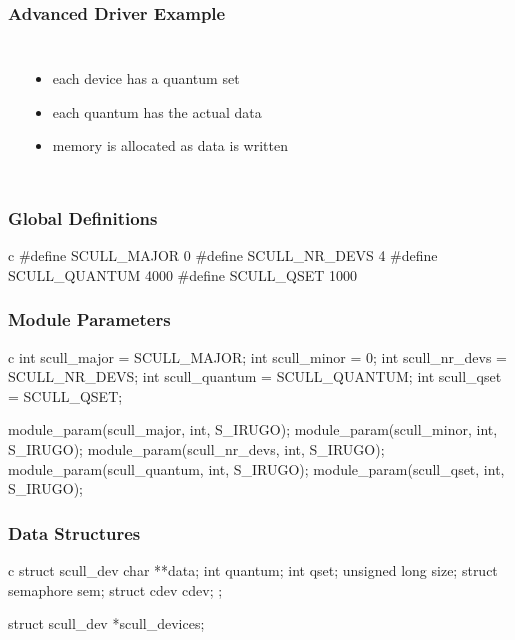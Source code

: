 \documentclass[dvipsnames]{beamer}
\begin{document}
\begin{frame}
  \frametitle{Advanced Driver Example}

  \begin{example}
    \begin{columns}
      \begin{center}
      \end{center}

      \pause
      \begin{itemize}
        \item each device has a quantum set
        \item each quantum has the actual data
        \item memory is allocated as data is written
      \end{itemize}
    \end{columns}
  \end{example}
\end{frame}

\begin{frame}[fragile]
  \frametitle{Global Definitions}

  \begin{example}[scull.h]
    \begin{pygments}{c}
#define SCULL_MAJOR 0
#define SCULL_NR_DEVS 4
#define SCULL_QUANTUM 4000
#define SCULL_QSET 1000
    \end{pygments}
  \end{example}
\end{frame}

\begin{frame}[fragile]
  \frametitle{Module Parameters}

  \begin{example}
    \begin{pygments}{c}
int scull_major = SCULL_MAJOR;
int scull_minor = 0;
int scull_nr_devs = SCULL_NR_DEVS;
int scull_quantum = SCULL_QUANTUM;
int scull_qset = SCULL_QSET;

module_param(scull_major, int, S_IRUGO);
module_param(scull_minor, int, S_IRUGO);
module_param(scull_nr_devs, int, S_IRUGO);
module_param(scull_quantum, int, S_IRUGO);
module_param(scull_qset, int, S_IRUGO);
    \end{pygments}
  \end{example}
\end{frame}

\begin{frame}[fragile]
  \frametitle{Data Structures}

  \begin{example}
    \begin{pygments}{c}
struct scull_dev {
    char **data;
    int quantum;
    int qset;
    unsigned long size;
    struct semaphore sem;
    struct cdev cdev;
};

struct scull_dev *scull_devices;
    \end{pygments}
  \end{example}
\end{frame}
\end{document}

